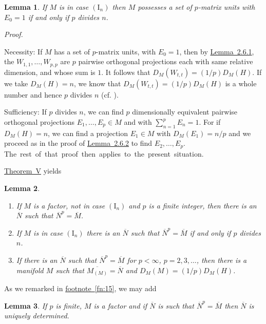 \documentclass[b5paper,twoside]{article}
\newcommand{\thmref}[2]{\hyperref[#1]{\mbox{Theorem~#2}}}
\newcommand{\lemref}[2]{\hyperref[#1]{\mbox{Lemma~#2}}}
\theoremstyle{mvnplain}
\newtheorem{lemma}{Lemma}[section]
\renewenvironment{proof}[1][Proof]{%
  \par\addvspace{0.35\baselineskip}%
  \noindent\textit{#1.}\ \normalfont\ignorespaces
}{%
  \par\addvspace{0.35\baselineskip}%
}
\newcommand{\M}{\mathbf M}
\newcommand{\N}{\mathbf N}
\newcommand{\Hilbert}{\mathfrak H}
\def\M{M}%
\def\N{N}%
\def\Hilbert{H}%
\def\mathfrak#1{#1}%
\begin{document}
\begin{lemma}\label{lem:2.6.3}
If $\M$ is in case $(\mathrm I_n)$ then $\M$ possesses a set of $p$-matrix
units with $E_0=1$ if and only if $p$ divides $n$.
\end{lemma}
\begin{proof}
Necessity: If $\M$ has a set of $p$-matrix units, with $E_0=1$, then by
\lemref{lem:2.6.1}{2.6.1}, the $W_{1,1},\ldots,W_{p,p}$ are $p$ pairwise
orthogonal projections each with same relative dimension, and whose sum is
$1$.  It follows that
$D_{\M}(W_{t,t})=(1/p)D_{\M}(\Hilbert)$.  If we take
$D_{\M}(\Hilbert)=n$, we know that
$D_{\M}(W_{t,t})=(1/p)D_{\M}(\Hilbert)$ is a whole number and hence $p$
divides $n$ (cf. \cite[p.~172, Theorem~VIII]{ref5}).

Sufficiency: If $p$ divides $n$, we can find $p$ dimensionally equivalent
pairwise orthogonal projections $E_1,\ldots,E_p\in\M$ and with
$\sum_{n=1}^{p}E_n=1$.  For if $D_{\M}(\Hilbert)=n$, we can find a
projection $E_1\in\M$ with $D_{\M}(E_1)=n/p$ and we proceed as in the proof
of \lemref{lem:2.6.2}{2.6.2} to find $E_2,\ldots,E_p$.
\mbox{The rest of that proof then applies to the present situation.}
\end{proof}

\thmref{thm:V}{V} yields
\begin{lemma}\label{lem:2.6.4}
\begin{enumerate}[label=(\roman*)]
\item If $\M$ is a factor, not in case $(\mathrm I_n)$ and $p$ is a finite
integer, then there is an $\overline{\N}$ such that
$\overline{\N}^{p}=\overline{\M}$.
\item If $\M$ is in case $(\mathrm I_n)$ there is an $\overline{\N}$ such
that $\overline{\N}^{p}=\overline{\M}$ if and only if $p$ divides $n$.
\item If there is an $\overline{\N}$ such that
$\overline{\N}^{p}=\overline{\M}$ for
$p<\infty$, $p=2,3,\ldots$, then there is a manifold $\mathfrak M$ such that
$\overline{\M_{(\mathfrak M)}}=\overline{\N}$ and
$D_{\M}(\mathfrak M)=(1/p)D_{\M}(\Hilbert)$.
\end{enumerate}
\end{lemma}

As we remarked in \hyperref[fn:15]{footnote~\ref*{fn:15}}, we may add
\begin{lemma}\label{lem:2.6.5}
If $p$ is finite, $\M$ is a factor and if $\overline{\N}$ is such that
$\overline{\N}^{p}=\overline{\M}$ then $\overline{\N}$ is uniquely
determined.
\end{lemma}
\end{document}
